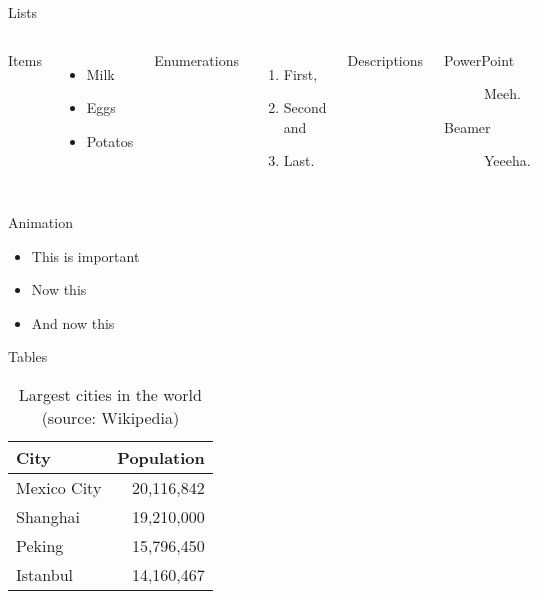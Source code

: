 \documentclass[10pt]{beamer}
\begin{document}
\begin{frame}{Lists}
  \begin{columns}[T,onlytextwidth]
      Items
      \begin{itemize}
        \item Milk \item Eggs \item Potatos
      \end{itemize}

      Enumerations
      \begin{enumerate}
        \item First, \item Second and \item Last.
      \end{enumerate}

      Descriptions
      \begin{description}
        \item[PowerPoint] Meeh. \item[Beamer] Yeeeha.
      \end{description}
  \end{columns}
\end{frame}
\begin{frame}{Animation}
  \begin{itemize}[<+- | alert@+>]
    \item \alert<4>{This is important}
    \item Now this
    \item And now this
  \end{itemize}
\end{frame}
\begin{frame}{Tables}
  \begin{table}
    \caption{Largest cities in the world (source: Wikipedia)}
    \begin{tabular}{lr}
      \toprule
      City & Population\\
      \midrule
      Mexico City & 20,116,842\\
      Shanghai & 19,210,000\\
      Peking & 15,796,450\\
      Istanbul & 14,160,467\\
      \bottomrule
    \end{tabular}
  \end{table}
\end{frame}
\end{document}
